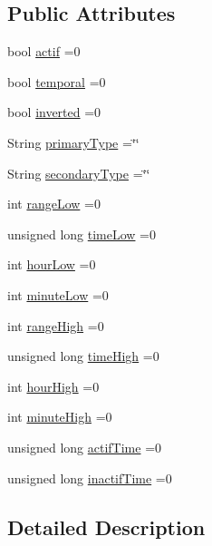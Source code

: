 \subsection*{Public Attributes}
\begin{DoxyCompactItemize}
\item 
bool \hyperlink{struct_jetpack_1_1state_aa177541689bbaea21a4650a083b0df77}{actif} =0
\item 
bool \hyperlink{struct_jetpack_1_1state_abd6039e7a48856550b0ffbf8bcff7bdd}{temporal} =0
\item 
bool \hyperlink{struct_jetpack_1_1state_a6bc03bb8f05b10aa142dbb0c39c87fb5}{inverted} =0
\item 
String \hyperlink{struct_jetpack_1_1state_aa6242c32eb0ab42aaea170636ab949e1}{primary\+Type} =\char`\"{}\char`\"{}
\item 
String \hyperlink{struct_jetpack_1_1state_a81cf9af139da095b7d91e2a87e50135b}{secondary\+Type} =\char`\"{}\char`\"{}
\item 
int \hyperlink{struct_jetpack_1_1state_ad0343b4fd5740c9c1b0876b27f84ace5}{range\+Low} =0
\item 
unsigned long \hyperlink{struct_jetpack_1_1state_ae544475d627308218e355a8dbb28ac74}{time\+Low} =0
\item 
int \hyperlink{struct_jetpack_1_1state_a9bd1b9e85800cfbec989ce40d1e9e08a}{hour\+Low} =0
\item 
int \hyperlink{struct_jetpack_1_1state_aa699e25d802a00e86d3a8032ec48b88b}{minute\+Low} =0
\item 
int \hyperlink{struct_jetpack_1_1state_ae330612c3da637654ecfa89d36620b93}{range\+High} =0
\item 
unsigned long \hyperlink{struct_jetpack_1_1state_a97c594b20b03b46ae0a6ac544f5d6c8d}{time\+High} =0
\item 
int \hyperlink{struct_jetpack_1_1state_ace824f4ae57fa1a4a27b2c6477b350e3}{hour\+High} =0
\item 
int \hyperlink{struct_jetpack_1_1state_a8c26c18b0ec449b7545934cb01cca028}{minute\+High} =0
\item 
unsigned long \hyperlink{struct_jetpack_1_1state_af2e1cc323ef9ffcc3cf4d203f85d726b}{actif\+Time} =0
\item 
unsigned long \hyperlink{struct_jetpack_1_1state_aaf817b1f9e7a4d65b9e3ca4726b281f6}{inactif\+Time} =0
\end{DoxyCompactItemize}


\subsection{Detailed Description}


